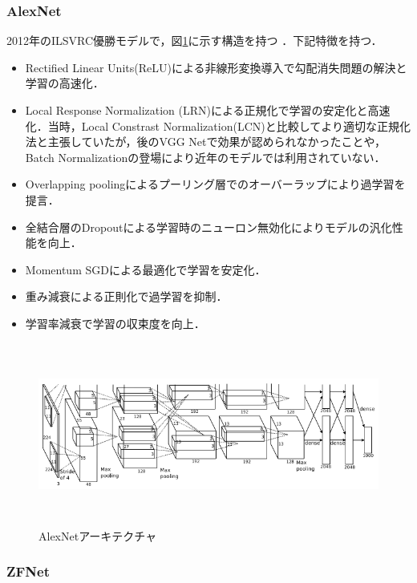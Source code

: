 \documentclass[11pt,a4paper]{jsarticle}
\begin{document}
\subsubsection{AlexNet}

2012年のILSVRC優勝モデルで，図\ref{arch_alexnet}に示す構造を持つ \cite{paper_alexnet}．下記特徴を持つ．

\begin{itemize}
	\item Rectified Linear Units(ReLU)による非線形変換導入で勾配消失問題の解決と学習の高速化．
	\item Local Response Normalization (LRN)による正規化で学習の安定化と高速化．当時，Local Constrast Normalization(LCN)と比較してより適切な正規化法と主張していたが，後のVGG Netで効果が認められなかったことや，Batch Normalizationの登場により近年のモデルでは利用されていない．
	\item Overlapping poolingによるプーリング層でのオーバーラップにより過学習を提言．
	\item 全結合層のDropoutによる学習時のニューロン無効化によりモデルの汎化性能を向上．
	\item Momentum SGDによる最適化で学習を安定化．
	\item 重み減衰による正則化で過学習を抑制．
	\item 学習率減衰で学習の収束度を向上．
\end{itemize}

\begin{figure} [H]
	\begin{center}
		\includegraphics[clip, height=6cm, bb=-20 0 675 219]{data/figure/arch_alexnet.png}
		\caption{AlexNetアーキテクチャ}
		\label{arch_alexnet}
	\end{center}
\end{figure}


\subsubsection{ZFNet}
\end{document}

